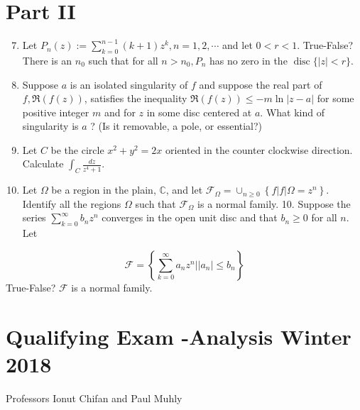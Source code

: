 \documentclass[10pt]{article}
\begin{document}
\section{Part II}
\begin{enumerate}
  \setcounter{enumi}{6}
  \item Let $P_{n}(z):=\sum_{k=0}^{n-1}(k+1) z^{k}, n=1,2, \cdots$ and let $0<r<1$. True-False? There is an $n_{0}$ such that for all $n>n_{0}, P_{n}$ has no zero in the $\operatorname{disc}\{|z|<r\}$.

  \item Suppose $a$ is an isolated singularity of $f$ and suppose the real part of $f, \mathfrak{R}(f(z))$, satisfies the inequality $\mathfrak{R}(f(z)) \leq-m \ln |z-a|$ for some positive integer $m$ and for $z$ in some disc centered at $a$. What kind of singularity is $a$ ? (Is it removable, a pole, or essential?)

  \item Let $C$ be the circle $x^{2}+y^{2}=2 x$ oriented in the counter clockwise direction. Calculate $\int_{C} \frac{d z}{z^{4}+1}$.

  \item Let $\Omega$ be a region in the plain, $\mathbb{C}$, and let $\mathcal{F}_{\Omega}=\cup_{n \geq 0}\left\{f|f| \Omega=z^{n}\right\}$. Identify all the regions $\Omega$ such that $\mathcal{F}_{\Omega}$ is a normal family. 10. Suppose the series $\sum_{k=0}^{\infty} b_{n} z^{n}$ converges in the open unit disc and that $b_{n} \geq 0$ for all $n$. Let

\end{enumerate}
$$
\mathcal{F}=\left\{\sum_{k=0}^{\infty} a_{n} z^{n}|| a_{n} \mid \leq b_{n}\right\}
$$
True-False? $\mathcal{F}$ is a normal family.

\section{Qualifying Exam -Analysis 
 Winter 2018}
Professors Ionut Chifan and Paul Muhly
\end{document}
